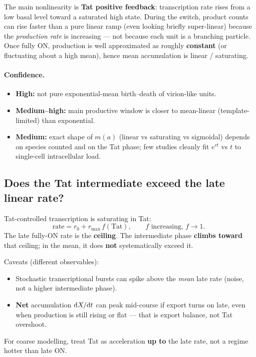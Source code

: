 \documentclass[11pt,a4paper]{article}
\newcommand{\dd}{{\rm d}}
\theoremstyle{plain}
\theoremstyle{definition}
\theoremstyle{remark}
\begin{document}
The main nonlinearity is \textbf{Tat positive feedback}: transcription rate
rises from a low basal level toward a saturated high state. During the switch,
product counts can rise faster than a pure linear ramp (even looking briefly
super-linear) because the \emph{production rate} is increasing --- not because
each unit is a branching particle. Once fully ON, production is well
approximated as roughly \textbf{constant} (or fluctuating about a high mean),
hence mean accumulation is linear / saturating.

\paragraph{Confidence.}
\begin{itemize}
\item \textbf{High:} not pure exponential-mean birth--death of virion-like units.
\item \textbf{Medium--high:} main productive window is closer to mean-linear
(template-limited) than exponential.
\item \textbf{Medium:} exact shape of $m(a)$ (linear vs saturating vs sigmoidal)
depends on species counted and on the Tat phase; few studies cleanly fit
$e^{rt}$ vs $t$ to single-cell intracellular load.
\end{itemize}

\subsection{Does the Tat intermediate exceed the late linear rate?}

Tat-controlled transcription is saturating in Tat:
\[
\text{rate}
= r_0 + r_{\max}\,f(\mathrm{Tat}),
\qquad f\text{ increasing, }f\to 1.
\]
The late fully-ON rate is the \textbf{ceiling}. The intermediate phase
\textbf{climbs toward} that ceiling; in the mean, it does \textbf{not}
systematically exceed it.

Caveats (different observables):
\begin{itemize}
\item Stochastic transcriptional bursts can spike above the \emph{mean} late rate
(noise, not a higher intermediate phase).
\item \textbf{Net} accumulation $\dd X/\dd t$ can peak mid-course if export turns
on late, even when production is still rising or flat --- that is export
balance, not Tat overshoot.
\end{itemize}
For coarse modelling, treat Tat as acceleration \textbf{up to} the late rate, not
a regime hotter than late ON.
\end{document}
